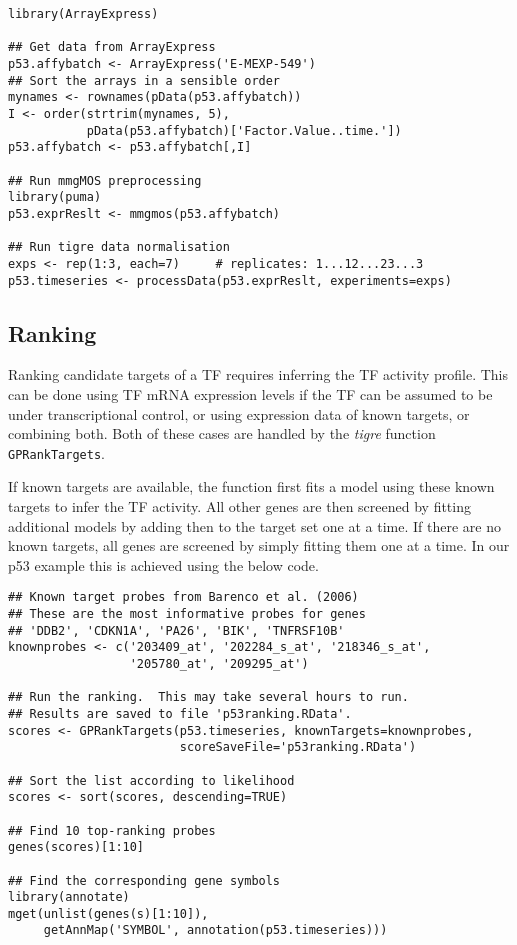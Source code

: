 \documentclass[11pt]{article}
\newcommand{\Rpackage}[1]{\emph{#1}}
\newcommand{\tigre}[0]{\Rpackage{tigre}}
\begin{document}
\begin{lstlisting}[frame=single]
library(ArrayExpress)

## Get data from ArrayExpress
p53.affybatch <- ArrayExpress('E-MEXP-549')
## Sort the arrays in a sensible order
mynames <- rownames(pData(p53.affybatch))
I <- order(strtrim(mynames, 5),
           pData(p53.affybatch)['Factor.Value..time.'])
p53.affybatch <- p53.affybatch[,I]

## Run mmgMOS preprocessing
library(puma)
p53.exprReslt <- mmgmos(p53.affybatch)

## Run tigre data normalisation
exps <- rep(1:3, each=7)     # replicates: 1...12...23...3
p53.timeseries <- processData(p53.exprReslt, experiments=exps)
\end{lstlisting}

\subsection{Ranking}

Ranking candidate targets of a TF requires inferring the TF activity
profile.  This can be done using TF mRNA expression levels if the TF
can be assumed to be under transcriptional control, or using
expression data of known targets, or combining both.  Both of these
cases are handled by the \tigre{} function \texttt{GPRankTargets}.

If known targets are available, the function first fits a model using
these known targets to infer the TF activity.  All other genes are
then screened by fitting additional models by adding then to the
target set one at a time.  If there are no known targets, all genes
are screened by simply fitting them one at a time.
In our p53 example this is achieved using the below code.

\begin{lstlisting}[frame=single]
## Known target probes from Barenco et al. (2006)
## These are the most informative probes for genes
## 'DDB2', 'CDKN1A', 'PA26', 'BIK', 'TNFRSF10B'
knownprobes <- c('203409_at', '202284_s_at', '218346_s_at',
                 '205780_at', '209295_at')

## Run the ranking.  This may take several hours to run.
## Results are saved to file 'p53ranking.RData'.
scores <- GPRankTargets(p53.timeseries, knownTargets=knownprobes,
                        scoreSaveFile='p53ranking.RData')

## Sort the list according to likelihood
scores <- sort(scores, descending=TRUE)

## Find 10 top-ranking probes
genes(scores)[1:10]

## Find the corresponding gene symbols
library(annotate)
mget(unlist(genes(s)[1:10]),
     getAnnMap('SYMBOL', annotation(p53.timeseries)))
\end{lstlisting}
\end{document}
